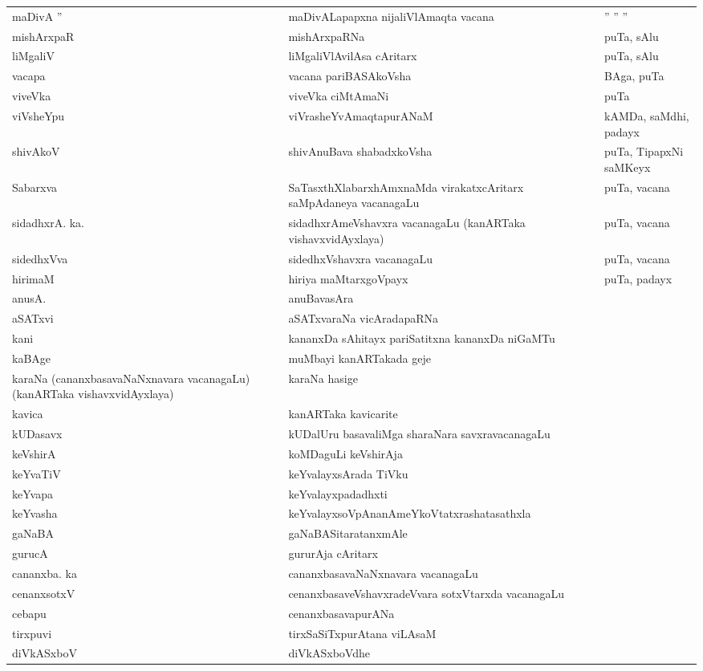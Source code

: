 {\begin{longtable}{>{\raggedright}p{3.5cm}ll}
maDivA '' & maDivALapapxna nijaliVlAmaqta vacana & \qquad '' '' ''\\
mishArxpaR & mishArxpaRNa & puTa, sAlu\\
liMgaliV & liMgaliVlAvilAsa cAritarx & puTa, sAlu\\
vacapa & vacana pariBASAkoVsha & BAga, puTa\\
viveVka & viveVka ciMtAmaNi & puTa\\
viVsheYpu & viVrasheYvAmaqtapurANaM & kAMDa, saMdhi, padayx\\
shivAkoV & shivAnuBava shabadxkoVsha & puTa, TipapxNi saMKeyx\\
Sabarxva & SaTasxthXlabarxhAmxnaMda virakatxcAritarx saMpAdaneya vacanagaLu & puTa, vacana\\
sidadhxrA. ka. & sidadhxrAmeVshavxra vacanagaLu (kanARTaka vishavxvidAyxlaya) & puTa, vacana\\
sidedhxVva & sidedhxVshavxra vacanagaLu & puTa, vacana\\
hirimaM & hiriya maMtarxgoVpayx & puTa, padayx\\
anusA. & anuBavasAra & \\
aSATxvi & aSATxvaraNa vicAradapaRNa & \\
kani & kananxDa sAhitayx pariSatitxna kananxDa niGaMTu & \\
kaBAge & muMbayi kanARTakada geje\\
karaNa (cananxbasavaNaNxnavara vacanagaLu) (kanARTaka vishavxvidAyxlaya) & karaNa hasige &\\
kavica & kanARTaka kavicarite & \\
kUDasavx & kUDalUru basavaliMga sharaNara savxravacanagaLu & \\
keVshirA & koMDaguLi keVshirAja & \\
keYvaTiV & keYvalayxsArada TiVku & \\
keYvapa & keYvalayxpadadhxti & \\
keYvasha & keYvalayxsoVpAnanAmeYkoVtatxrashatasathxla & \\
gaNaBA & gaNaBASitaratanxmAle & \\
gurucA & gururAja cAritarx & \\
cananxba. ka & cananxbasavaNaNxnavara vacanagaLu & \\
cenanxsotxV & cenanxbasaveVshavxradeVvara sotxVtarxda vacanagaLu & \\
cebapu & cenanxbasavapurANa & \\
tirxpuvi & tirxSaSiTxpurAtana viLAsaM & \\
diVkASxboV & diVkASxboVdhe & \\

\end{longtable}}
